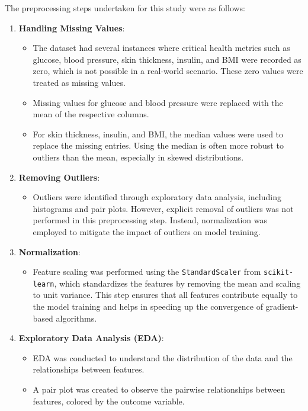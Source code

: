 The preprocessing steps undertaken for this study were as follows:

\begin{enumerate}
    \item \textbf{Handling Missing Values}:
    \begin{itemize}
        \item The dataset had several instances where critical health metrics such as glucose, blood pressure, skin thickness, insulin, and BMI were recorded as zero, which is not possible in a real-world scenario. These zero values were treated as missing values.
        \item Missing values for glucose and blood pressure were replaced with the mean of the respective columns.
        \item For skin thickness, insulin, and BMI, the median values were used to replace the missing entries. Using the median is often more robust to outliers than the mean, especially in skewed distributions.
    \end{itemize}
    \item \textbf{Removing Outliers}:
    \begin{itemize}
        \item Outliers were identified through exploratory data analysis, including histograms and pair plots. However, explicit removal of outliers was not performed in this preprocessing step. Instead, normalization was employed to mitigate the impact of outliers on model training.
    \end{itemize}
    \item \textbf{Normalization}:
    \begin{itemize}
        \item Feature scaling was performed using the \texttt{StandardScaler} from \texttt{scikit-learn}, which standardizes the features by removing the mean and scaling to unit variance. This step ensures that all features contribute equally to the model training and helps in speeding up the convergence of gradient-based algorithms.
    \end{itemize}
    \item \textbf{Exploratory Data Analysis (EDA)}:
    \begin{itemize}
        \item EDA was conducted to understand the distribution of the data and the relationships between features.
        \item A pair plot was created to observe the pairwise relationships between features, colored by the outcome variable.

\end{itemize}
\end{enumerate}
